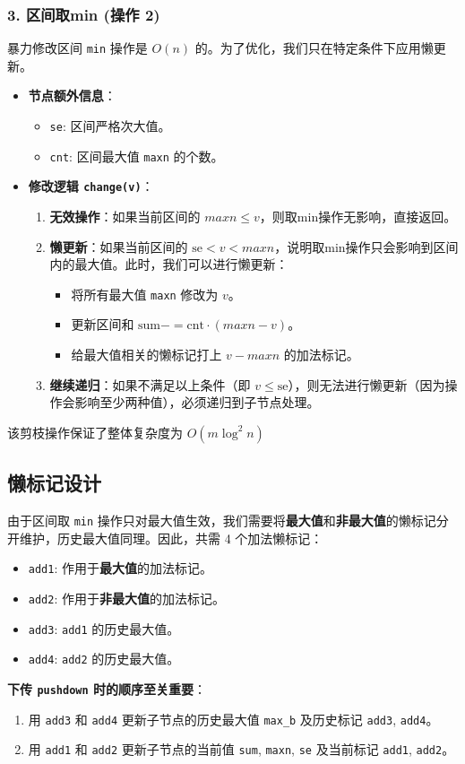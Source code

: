 \subsubsection*{3. 区间取min (操作 2)}
暴力修改区间 \texttt{min} 操作是 $O(n)$ 的。为了优化，我们只在特定条件下应用懒更新。
\begin{itemize}
\item \textbf{节点额外信息}：
\begin{itemize}
\item \texttt{se}: 区间严格次大值。
\item \texttt{cnt}: 区间最大值 \texttt{maxn} 的个数。
\end{itemize}
\item \textbf{修改逻辑 \texttt{change(v)}}：
\begin{enumerate}
\item \textbf{无效操作}：如果当前区间的 $maxn\le v$，则取min操作无影响，直接返回。
\item \textbf{懒更新}：如果当前区间的 $\text{se}<v<maxn$，说明取min操作只会影响到区间内的最大值。此时，我们可以进行懒更新：
\begin{itemize}
\item 将所有最大值 \texttt{maxn} 修改为 $v$。
\item 更新区间和 $\text{sum}-=\text{cnt}\cdot(maxn-v)$。
\item 给最大值相关的懒标记打上 $v-maxn$ 的加法标记。
\end{itemize}
\item \textbf{继续递归}：如果不满足以上条件（即 $v\le\text{se}$），则无法进行懒更新（因为操作会影响至少两种值），必须递归到子节点处理。
\end{enumerate}
\end{itemize}
该剪枝操作保证了整体复杂度为 $O(m\log^2 n)$

\subsection*{懒标记设计}
由于区间取 \texttt{min} 操作只对最大值生效，我们需要将\textbf{最大值}和\textbf{非最大值}的懒标记分开维护，历史最大值同理。因此，共需 4 个加法懒标记：
\begin{itemize}
\item \texttt{add1}: 作用于\textbf{最大值}的加法标记。
\item \texttt{add2}: 作用于\textbf{非最大值}的加法标记。
\item \texttt{add3}: \texttt{add1} 的历史最大值。
\item \texttt{add4}: \texttt{add2} 的历史最大值。
\end{itemize}
\textbf{下传 \texttt{pushdown} 时的顺序至关重要}：
\begin{enumerate}
\item 用 \texttt{add3} 和 \texttt{add4} 更新子节点的历史最大值 \texttt{max\_b} 及历史标记 \texttt{add3}, \texttt{add4}。
\item 用 \texttt{add1} 和 \texttt{add2} 更新子节点的当前值 \texttt{sum}, \texttt{maxn}, \texttt{se} 及当前标记 \texttt{add1}, \texttt{add2}。
\end{enumerate}

